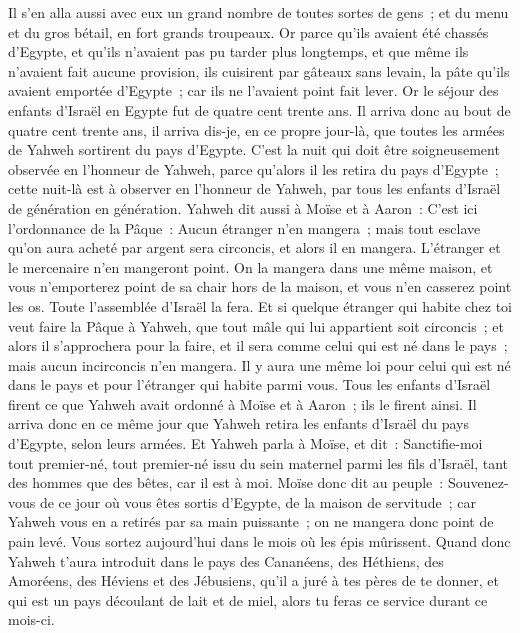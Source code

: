 \begin{multicols}{2}
Il s'en alla aussi avec eux un grand nombre de toutes sortes de gens~; et du menu et du gros bétail, en fort grands troupeaux.
 Or parce qu'ils avaient été chassés d'Egypte, et qu'ils n'avaient pas pu tarder plus longtemps, et que même ils n'avaient fait aucune provision, ils cuisirent par gâteaux sans levain, la pâte qu'ils avaient emportée d'Egypte~; car ils ne l'avaient point fait lever. 
Or le séjour des enfants d'Israël en Egypte fut de quatre cent trente ans.
Il arriva donc au bout de quatre cent trente ans, il arriva dis-je, en ce propre jour-là, que toutes les armées de Yahweh sortirent du pays d'Egypte.
C'est la nuit qui doit être soigneusement observée en l'honneur de Yahweh, parce qu'alors il les retira du pays d'Egypte~; cette nuit-là est à observer en l'honneur de Yahweh, par tous les enfants d'Israël de génération en génération.
Yahweh dit aussi à Moïse et à Aaron~: C'est ici l'ordonnance de la Pâque~: Aucun étranger n'en mangera~;
mais tout esclave qu'on aura acheté par argent sera circoncis, et alors il en mangera.
L'étranger et le mercenaire n'en mangeront point.
On la mangera dans une même maison, et vous n'emporterez point de sa chair hors de la maison, et vous n'en casserez point les os.
Toute l'assemblée d'Israël la fera.
Et si quelque étranger qui habite chez toi veut faire la Pâque à Yahweh, que tout mâle qui lui appartient soit circoncis~; et alors il s'approchera pour la faire, et il sera comme celui qui est né dans le pays~; mais aucun incirconcis n'en mangera.
Il y aura une même loi pour celui qui est né dans le pays et pour l'étranger qui habite parmi vous.
Tous les enfants d'Israël firent ce que Yahweh avait ordonné à Moïse et à Aaron~; ils le firent ainsi.
Il arriva donc en ce même jour que Yahweh retira les enfants d'Israël du pays d'Egypte, selon leurs armées.
\VerseOne{}Et Yahweh parla à Moïse, et dit~:
Sanctifie-moi tout premier-né, tout premier-né issu du sein maternel parmi les fils d'Israël, tant des hommes que des bêtes, car il est à moi.
Moïse donc dit au peuple~: Souvenez-vous de ce jour où vous êtes sortis d'Egypte, de la maison de servitude~; car Yahweh vous en a retirés par sa main puissante~; on ne mangera donc point de pain levé.
Vous sortez aujourd'hui dans le mois où les épis mûrissent.
Quand donc Yahweh t'aura introduit dans le pays des Cananéens, des Héthiens, des Amoréens, des Héviens et des Jébusiens, qu'il a juré à tes pères de te donner, et qui est un pays découlant de lait et de miel, alors tu feras ce service durant ce mois-ci.

\end{multicols}

